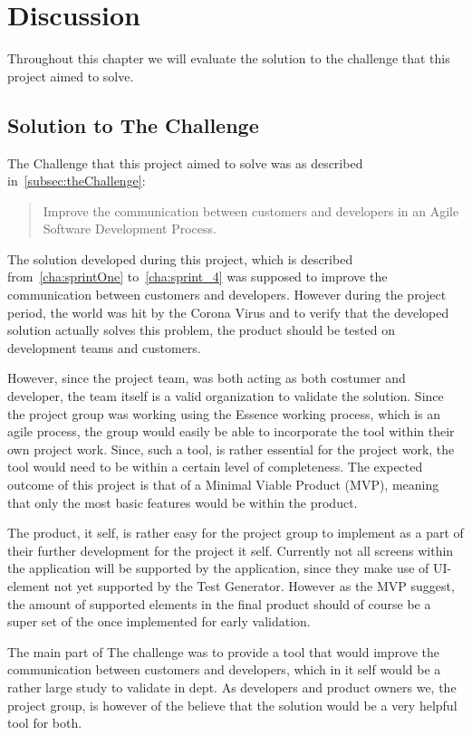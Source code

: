\section{Discussion}

Throughout this chapter we will evaluate the solution to the challenge that this project aimed to solve.

\subsection{Solution to The Challenge}

The Challenge that this project aimed to solve was as described in~\autoref{subsec:theChallenge}:

\begin{quote}
    Improve the communication between customers and developers in an Agile Software Development Process.
\end{quote}

The solution developed during this project, which is described from~\autoref{cha:sprintOne} to~\autoref{cha:sprint_4} was supposed to improve the communication between customers and developers.
However during the project period, the world was hit by the Corona Virus and to verify that the developed solution actually solves this problem, the product should be tested on development teams and customers.

However, since the project team, was both acting as both costumer and developer, the team itself is a valid organization to validate the solution.
Since the project group was working using the Essence working process, which is an agile process, the group would easily be able to incorporate the tool within their own project work.
Since, such a tool, is rather essential for the project work, the tool would need to be within a certain level of completeness.
The expected outcome of this project is that of a Minimal Viable Product (MVP), meaning that only the most basic features would be within the product.

The product, it self, is rather easy for the project group to implement as a part of their further development for the project it self.
Currently not all screens within the application will be supported by the application, since they make use of UI-element not yet supported by the Test Generator.
However as the MVP suggest, the amount of supported elements in the final product should of course be a super set of the once implemented for early validation.

The main part of The challenge was to provide a tool that would improve the communication between customers and developers, which in it self would be a rather large study to validate in dept.
As developers and product owners we, the project group, is however of the believe that the solution would be a very helpful tool for both.